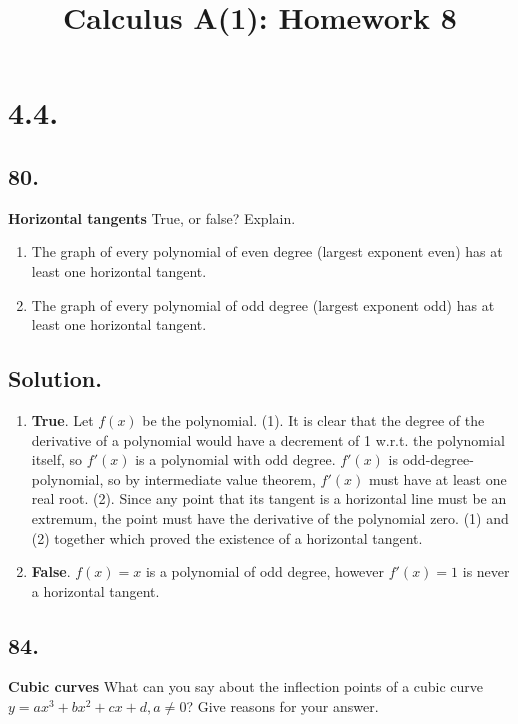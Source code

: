 \documentclass{article}
\title{Calculus A(1): Homework 8}
\begin{document}
\maketitle
\section*{4.4.}
\subsection*{80.}
\textbf{Horizontal tangents   }True, or false? Explain.
\begin{enumerate} [label=\textbf{\alph*.}]
    \item The graph of every polynomial of even degree (largest exponent even) has at least one horizontal tangent.
    \item  The graph of every polynomial of odd degree (largest exponent odd) has at least one horizontal tangent.
\end{enumerate}

\subsection*{Solution.}
\begin{enumerate} [label=\textbf{\alph*.}]
    \item \textbf{True}.\newline
    Let $f(x)$ be the polynomial.\newline
    (1). It is clear that the degree of the derivative of a polynomial would have a decrement of 1 w.r.t. the polynomial itself, so $f'(x)$ is a polynomial with odd degree.\newline
    $f'(x)$ is odd-degree-polynomial, so by intermediate value theorem, $f'(x)$ must have at least one real root.\newline
    (2). Since any point that its tangent is a horizontal line must be an extremum,  the point must have the derivative of the polynomial zero. \newline
    (1) and (2) together which proved the existence of a horizontal tangent.
    \item \textbf{False}. $f(x)=x$ is a polynomial of odd degree, however $f'(x)=1$ is never a horizontal tangent.
\end{enumerate}
\subsection*{84.}
\textbf{Cubic curves } What can you say about the inflection points of a cubic curve $y=ax^3+bx^2+cx+d,a\neq 0$? Give reasons for your answer.
\end{document}
